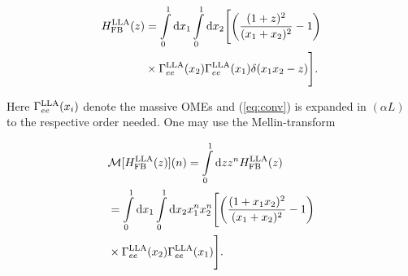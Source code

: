 \begin{align}        H_{\rm FB}^{\rm LLA}(z) &= \int\limits_{0}^{1} {\rm d} x_1 
\int\limits_{0}^{1} {\rm d} x_2 \Biggl [ \left(
\frac{(1+z)^2}{(x_1+x_2)^2} -
        1 \right) \nonumber\\
        &\times\Gamma_{ee}^{\rm LLA}(x_2) \Gamma_{ee}^{\rm LLA}(x_1) 
\delta(x_1 x_2 - z) \Biggr ]. \label{eq:conv}
\end{align}

Here $\Gamma_{ee}^{\rm LLA}(x_i)$ denote the {massive OMEs} and (\ref{eq:conv}) is expanded in
$(\alpha L)$ to the respective order needed. One may use the Mellin-transform

\begin{align} 
        &\mathcal{M}[H_{\rm FB}^{\rm LLA}(z)](n) = \int\limits_{0}^{1} {\rm 
d}z z^n H_{\rm FB}^{\rm LLA}(z) \nonumber\\
&=
\int\limits_{0}^{1} {\rm d}x_1
        \int\limits_{0}^{1} {\rm d}x_2 x_1^n x_2^n \Biggl [ \left( 
\frac{(1+x_1x_2)^2}{(x_1+x_2)^2} - 1 \right) \nonumber \\   
&\times\Gamma_{ee}^{\rm LLA}(x_2)
        \Gamma_{ee}^{\rm LLA}(x_1) \Biggr ].
\end{align}


